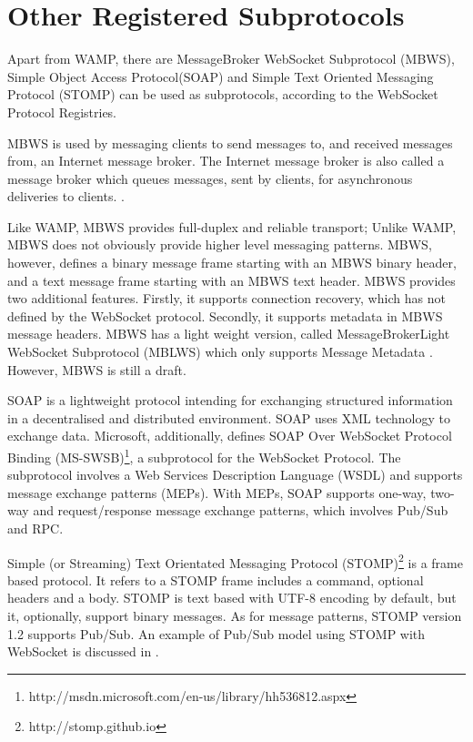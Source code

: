 \section{Other Registered Subprotocols}

Apart from WAMP, there are MessageBroker WebSocket Subprotocol (MBWS), Simple Object Access Protocol(SOAP) and Simple Text Oriented Messaging Protocol (STOMP) can be used as subprotocols, according to the WebSocket Protocol Registries.

MBWS is used by messaging clients to send messages to, and received messages from, an Internet message broker. The Internet message broker is also called a message broker which queues messages, sent by clients, for asynchronous deliveries to clients. \cite{hapner2012messagebroker}. 

Like WAMP, MBWS provides full-duplex and reliable transport; Unlike WAMP, MBWS does not obviously provide higher level messaging patterns. MBWS, however, defines a binary message frame starting with an MBWS binary header, and a text message frame starting with an MBWS text header. MBWS provides two additional features. Firstly, it supports connection recovery, which has not defined by the WebSocket protocol. Secondly, it supports metadata in MBWS message headers. MBWS has a light weight version, called MessageBrokerLight WebSocket Subprotocol (MBLWS) which only supports Message Metadata \cite{hapner2012messagebroker}. However, MBWS is still a draft. 

SOAP is a lightweight protocol intending for exchanging structured information in a decentralised and distributed environment. SOAP uses XML technology to exchange data. \cite{gudginsoap} Microsoft, additionally, defines SOAP Over WebSocket Protocol Binding (MS-SWSB)\footnote{http://msdn.microsoft.com/en-us/library/hh536812.aspx}, a subprotocol for the WebSocket Protocol. The subprotocol involves a Web Services Description Language (WSDL) and supports message exchange patterns (MEPs). With MEPs, SOAP supports one-way, two-way and request/response message exchange patterns, which involves Pub/Sub and RPC.

Simple (or Streaming) Text Orientated Messaging Protocol (STOMP)\footnote{http://stomp.github.io} is a frame based protocol. It refers to a STOMP frame includes a command, optional headers and a body. STOMP is text based with UTF-8 encoding by default, but it, optionally, support binary messages. As for message patterns, STOMP version 1.2 supports Pub/Sub. An example of Pub/Sub model using STOMP with WebSocket is discussed in \cite{wang2012definitive}.

